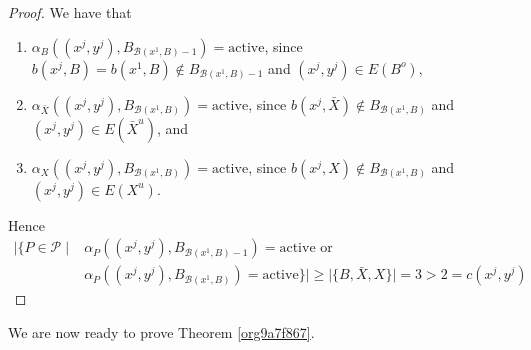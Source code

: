 \documentclass[fontsize=11pt,paper=a4]{book}
\begin{document}
\begin{proof}
We have that

\begin{enumerate}
\item \(\alpha_B((x^j,y^j),B_{\mathcal{B}(x^1,B)-1})=\mathrm{active}\), since \(b(x^j,B)=b(x^1,B)\notin B_{\mathcal{B}(x^1,B)-1}\) and \((x^j,y^j)\in E(B^o)\),

\item \(\alpha_{\bar{X}}((x^j,y^j),B_{\mathcal{B}(x^1,B)})=\mathrm{active}\), since \(b(x^j,\bar{X})\notin B_{\mathcal{B}(x^1,B)}\) and \((x^j,y^j)\in E(\bar{X}^u)\), and

\item \(\alpha_{X}((x^j,y^j),B_{\mathcal{B}(x^1,B)})=\mathrm{active}\), since \(b(x^j,X)\notin B_{\mathcal{B}(x^1,B)}\) and \((x^j,y^j)\in E(X^u)\).
\end{enumerate}

Hence
\begin{align*}
\lvert\{P\in\mathcal{P}\mid&\alpha_P((x^j,y^j),B_{\mathcal{B}(x^1,B)-1})=\mathrm{active}\text{ or }\\
&\alpha_P((x^j,y^j),B_{\mathcal{B}(x^1,B)})=\mathrm{active}\}\rvert\geq\lvert\{B,\bar{X},X\}\rvert=3>2=c(x^j,y^j)
\end{align*}
\end{proof}

We are now ready to prove Theorem \ref{org9a7f867}.
\end{document}
